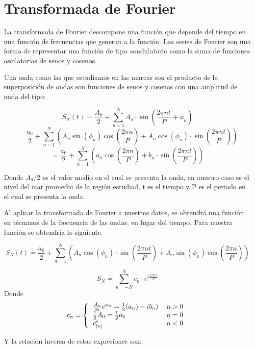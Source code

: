 \section{Transformada de Fourier}
La transformada de Fourier descompone una función que depende del tiempo en una función de frecuencias que generan a la función. Las series de Fourier son una forma de representar una función de tipo aondulatorio como la suma de funciones oscilatorias de senos y cosenos.

Una onda como las que estudiamos en las mareas son el producto de la superposición de ondas son funciones de senos y cosenos con una amplitud de onda  del tipo:

\begin{equation}
S_N(t) = \frac{A_0}{2} + \sum_{n=1}^{N} A_n\cdot\sin{(\frac{2\pi n t}{P}+ \phi_n)}
\label{wave}
\end{equation}
$$= \frac{a_0}{2} + \sum_{n=1}^{N} \left(A_n\sin{(\phi_n)}\cos{(\frac{2 \pi n}{P})} +  A_n\cos{(\phi_n)}\cdot\sin{(\frac{2\pi n t}{P})} \right)$$
$$=\frac{a_0}{2} + \sum_{n=1}^{N} \left( a_n\cos{(\frac{2 \pi n}{P})} +  b_n\cdot\sin{(\frac{2\pi n t}{P})} \right)$$


Donde $A_0/2$ es el valor medio en el cual se presenta la onda, en nuestro caso es el nivel del mar promedio de la región estudiad, t es el tiempo y P es el periodo en el cual se presenta la onda.

Al aplicar la transformada de Fourier a nuestros datos, se obtendrá una función en términos de la frecuencia de las ondas, en lugar del tiempo. Para nuestra función se obtendría lo siguiente.

$$S_N(t) =  \frac{a_0}{2} + \sum_{n=1}^{N} \left( A_n\cos{(\phi_n)}\cdot\sin{(\frac{2\pi n t}{P})} + A_n\sin{(\phi_n)}\cos{(\frac{2 \pi n}{P})} \right)$$

\begin{equation}
S_N =\sum_{n=-N}^{N} c_n \cdot e^{i \frac{2\pi n x}{P}}
\end{equation}
Donde
\[ 
c_n = \left\{
  \begin{tabular}{ll}
  $\frac{A_n}{2i}e^{\phi_n} = \frac{1}{2} (a_n)- ib_n) $ & $ n >0$ \\
  $\frac{1}{2} A_0 = \frac{1}{2}a_0 $ & $ n=0 $\\
  $c_{|n|}^{*} $ & $ n<0 $ \\ 
  \end{tabular}
  \right.
\]

Y la relación inversa de estas expresiones son:

